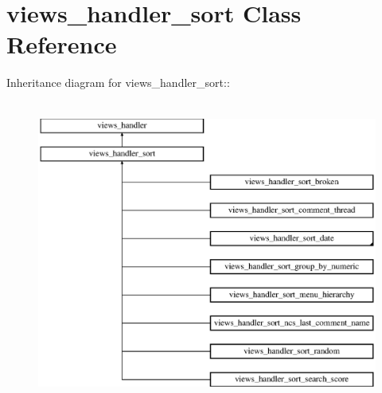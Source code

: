 \hypertarget{classviews__handler__sort}{
\section{views\_\-handler\_\-sort Class Reference}
\label{classviews__handler__sort}
}
Inheritance diagram for views\_\-handler\_\-sort::\begin{figure}[H]
\begin{center}
\leavevmode
\includegraphics[height=10cm]{classviews__handler__sort}
\end{center}
\end{figure}
